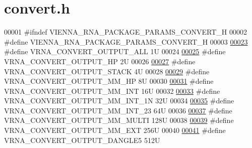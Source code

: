 \hypertarget{convert_8h_source}{}\section{convert.\+h}
\label{convert_8h_source}

\begin{DoxyCode}
00001 \textcolor{preprocessor}{#ifndef VIENNA\_RNA\_PACKAGE\_PARAMS\_CONVERT\_H}
00002 \textcolor{preprocessor}{#define VIENNA\_RNA\_PACKAGE\_PARAMS\_CONVERT\_H}
00003 
\hyperlink{group__energy__parameters__convert_ga8dc6aee5a806c49b71557152f9616bc4}{00023} \textcolor{preprocessor}{#define VRNA\_CONVERT\_OUTPUT\_ALL           1U}
00024 
\hyperlink{group__energy__parameters__convert_gaf66fe2cb11dfcfd32d791049c254a8a4}{00025} \textcolor{preprocessor}{#define VRNA\_CONVERT\_OUTPUT\_HP            2U}
00026 
\hyperlink{group__energy__parameters__convert_gad23522d63f8d4c50d5a5deee9bee3ef2}{00027} \textcolor{preprocessor}{#define VRNA\_CONVERT\_OUTPUT\_STACK         4U}
00028 
\hyperlink{group__energy__parameters__convert_gaa892c7b4957459090f3e08da298cc347}{00029} \textcolor{preprocessor}{#define VRNA\_CONVERT\_OUTPUT\_MM\_HP         8U}
00030 
\hyperlink{group__energy__parameters__convert_ga4ff223fb1f9c62cd92d9ab811ad03d55}{00031} \textcolor{preprocessor}{#define VRNA\_CONVERT\_OUTPUT\_MM\_INT        16U}
00032 
\hyperlink{group__energy__parameters__convert_gaf5d3743219f83c6348155cd81e755bbb}{00033} \textcolor{preprocessor}{#define VRNA\_CONVERT\_OUTPUT\_MM\_INT\_1N     32U}
00034 
\hyperlink{group__energy__parameters__convert_ga78382ec622ba99e0ac2262317bdd7316}{00035} \textcolor{preprocessor}{#define VRNA\_CONVERT\_OUTPUT\_MM\_INT\_23     64U}
00036 
\hyperlink{group__energy__parameters__convert_gae67af9f1cdf7baf2865481282a5d1034}{00037} \textcolor{preprocessor}{#define VRNA\_CONVERT\_OUTPUT\_MM\_MULTI      128U}
00038 
\hyperlink{group__energy__parameters__convert_gaf14ead7ef1fdbe725ade653750fc51e3}{00039} \textcolor{preprocessor}{#define VRNA\_CONVERT\_OUTPUT\_MM\_EXT        256U}
00040 
\hyperlink{group__energy__parameters__convert_ga036ffd996d8c8a9acf631760dd1da24b}{00041} \textcolor{preprocessor}{#define VRNA\_CONVERT\_OUTPUT\_DANGLE5       512U}

\end{DoxyCode}
